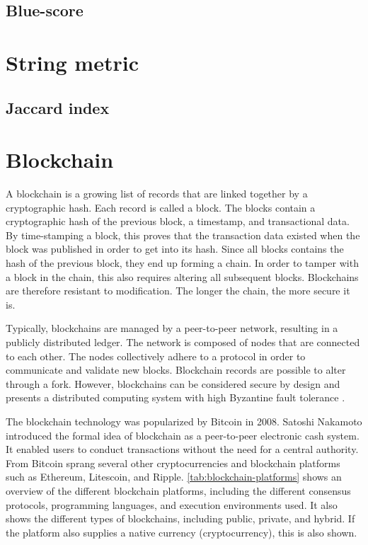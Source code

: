 \subsection{Blue-score}
\label{sec:blue-score}


\section{String metric}
\label{sec:string-metric}

\subsection{Jaccard index}
\label{sec:jaccard-index}


\section{Blockchain}
\label{sec:blockchain}
A blockchain is a growing list of records that are linked together by a cryptographic hash. Each record is called a block. The blocks contain a cryptographic hash of the previous block, a timestamp, and transactional data. By time-stamping a block, this proves that the transaction data existed when the block was published in order to get into its hash. Since all blocks contains the hash of the previous block, they end up forming a chain. In order to tamper with a block in the chain, this also requires altering all subsequent blocks. Blockchains are therefore resistant to modification. The longer the chain, the more secure it is.

Typically, blockchains are managed by a peer-to-peer network, resulting in a publicly distributed ledger. The network is composed of nodes that are connected to each other. The nodes collectively adhere to a protocol in order to communicate and validate new blocks. Blockchain records are possible to alter through a \gls{fork}. However, blockchains can be considered secure by design and presents a distributed computing system with high Byzantine fault tolerance \cite{sankar2017survey}.

The blockchain technology was popularized by Bitcoin in 2008. Satoshi Nakamoto introduced the formal idea of blockchain as a peer-to-peer electronic cash system. It enabled users to conduct transactions without the need for a central authority. From Bitcoin sprang several other cryptocurrencies and blockchain platforms such as Ethereum, Litescoin, and Ripple. \cref{tab:blockchain-platforms} shows an overview of the different blockchain platforms, including the different consensus protocols, programming languages, and execution environments used. It also shows the different types of blockchains, including public, private, and hybrid. If the platform also supplies a native currency (cryptocurrency), this is also shown.

